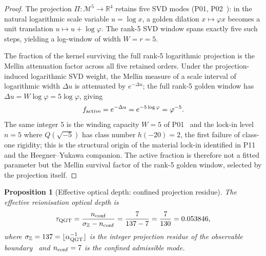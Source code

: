 \documentclass[twocolumn,10pt]{article}
\newcommand{\vp}{\varphi}
\newcommand{\Mfive}{\mathcal{M}^5}
\newcommand{\Rfour}{\mathbb{R}^4}
\newtheorem{proposition}[theorem]{Proposition}
\begin{document}
\begin{proof}
The projection $\Pi:\Mfive\to\Rfour$ retains five SVD modes
(P01, P02~\cite{CamP01,CamP02}): in the natural logarithmic scale
variable $u=\log x$, a golden dilation $x\mapsto\vp x$ becomes a
unit translation $u\mapsto u+\log\vp$. The rank-5 SVD window
spans exactly five such steps, yielding a log-window of width
$W=r=5$.

The fraction of the kernel surviving the full rank-5 logarithmic
projection is the Mellin attenuation factor across all five retained
orders. Under the projection-induced logarithmic SVD weight, the
Mellin measure of a scale interval of logarithmic width $\Delta u$
is attenuated by $e^{-\Delta u}$; the full rank-5 golden window has
$\Delta u = W\log\vp = 5\log\vp$, giving
\begin{equation*}
  f_{\rm active}
  = e^{-\Delta u}
  = e^{-5\log\vp}
  = \vp^{-5}.
\end{equation*}
The same integer $5$ is the winding capacity $W=5$ of P01~\cite{CamP01}
and the lock-in level $n=5$ where $Q(\sqrt{-5})$ has class number
$h(-20)=2$, the first failure of class-one rigidity; this is the
structural origin of the material lock-in identified in
P11~\cite{CamP11} and the Heegner--Yukawa companion. The active
fraction is therefore not a fitted parameter but the Mellin
survival factor of the rank-5 golden window, selected by the
projection itself.
\end{proof}

\begin{proposition}[Effective optical depth: confined projection residue]
\label{prop:tau}
The effective reionisation optical depth is
\begin{equation}
  \tau_{\rm QGT}
  = \frac{n_{\rm conf}}{\sigma_{\mathbb{Z}}-n_{\rm conf}}
  = \frac{7}{137-7}
  = \frac{7}{130}
  = 0.053846,
  \label{eq:tau_struct}
\end{equation}
where $\sigma_{\mathbb{Z}}=137=\lfloor\alpha^{-1}_{\rm QGT}\rfloor$ is the
integer projection residue of the observable boundary~\cite{CamP09}
and $n_{\rm conf}=7$ is the confined admissible mode.
\end{proposition}
\end{document}
